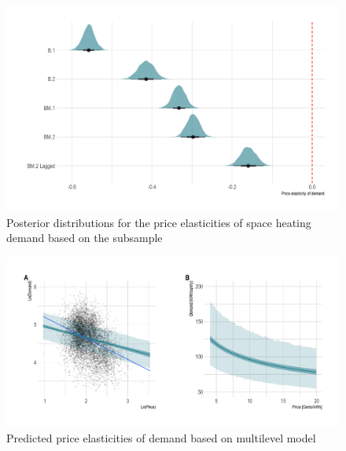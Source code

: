 \documentclass[12pt,twoside]{reedthesis}
\begin{document}
\begin{figure}

{\centering \includegraphics[width=1\linewidth]{figure/posterior-distributions} 

}

\caption{Posterior distributions for the price elasticities of space heating demand based on the subsample}\label{fig:posterior-distributions}
\end{figure}
\begin{figure}

{\centering \includegraphics[width=1.04\linewidth]{figure/bm2_prediction} 

}

\caption{Predicted price elasticities of demand based on multilevel model}\label{fig:elasticity-predictions-bm2}
\end{figure}
\end{document}
